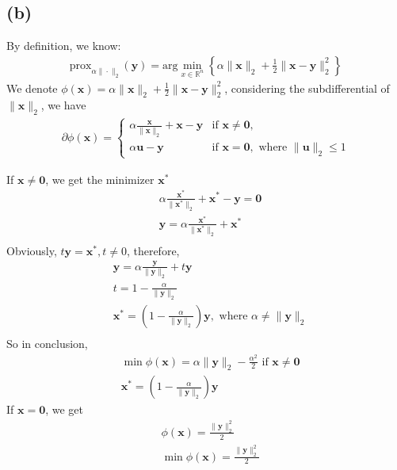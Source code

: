 \documentclass{article}
\newcommand{\R}{\mathbb{R}}
\begin{document}
\subsection*{(b)}
By definition, we know:
\begin{align*}
    \text{prox}_{\alpha \|\cdot\|_2} (\bm{y}) = \text{arg} \min_{x \in \R^n} \left\{ \alpha\|\bm{x}\|_2 + \frac{1}{2} \|\bm{x} - \bm{y}\|_2^2\right\}
\end{align*}
We denote \(\phi(\bm{x}) = \alpha\|\bm{x}\|_2 + \frac{1}{2} \|\bm{x} - \bm{y}\|_2^2\), considering the subdifferential of \(\|\bm{x}\|_2\), we have
\begin{align*}
    \partial \phi(\bm{x}) = \begin{cases}
        \alpha \frac{\bm{x}}{\|\bm{x}\|_2} + \bm{x} - \bm{y} &\text{if } \bm{x} \ne \bm{0}, \\
        \alpha\bm{u} - \bm{y}   &\text{if } \bm{x} = \bm{0}, \text{ where }\|\bm{u}\|_2 \leq 1
    \end{cases}
\end{align*}

If \(\bm{x} \ne \bm{0}\), we get the minimizer \(\bm{x}^*\)
\begin{align*}
    &\alpha \frac{\bm{x}^*}{\|\bm{x}^*\|_2} + \bm{x}^* - \bm{y} = \bm{0} \\
    &\bm{y} = \alpha \frac{\bm{x}^*}{\|\bm{x}^*\|_2} + \bm{x}^* \\
\end{align*}
Obviously, \(t\bm{y} = \bm{x}^*, t \ne 0\), therefore,
\begin{align*}
    &\bm{y} = \alpha \frac{\bm{y}}{\|\bm{y}\|_2} + t\bm{y} \\
    &t = 1 - \frac{\alpha}{\|\bm{y}\|_2} \\
    &\bm{x}^* = (1 - \frac{\alpha}{\|\bm{y}\|_2})\bm{y} , \text{ where  } \alpha \ne \|\bm{y}\|_2\\
\end{align*}
So in conclusion, 
\begin{align*}
    &\min \phi(\bm{x}) = \alpha\|\bm{y}\|_2 - \frac{\alpha^2}{2} \text{  if  } \bm{x} \ne \bm{0} \\
    &\bm{x}^* = (1 - \frac{\alpha}{\|\bm{y}\|_2})\bm{y}
\end{align*}
If \(\bm{x} = \bm{0}\), we get
\begin{align*}
    &\phi(\bm{x}) = \frac{\|\bm{y}\|_2^2}{2} \\
    &\min \phi(\bm{x}) = \frac{\|\bm{y}\|_2^2}{2} \\
\end{align*}
\end{document}
